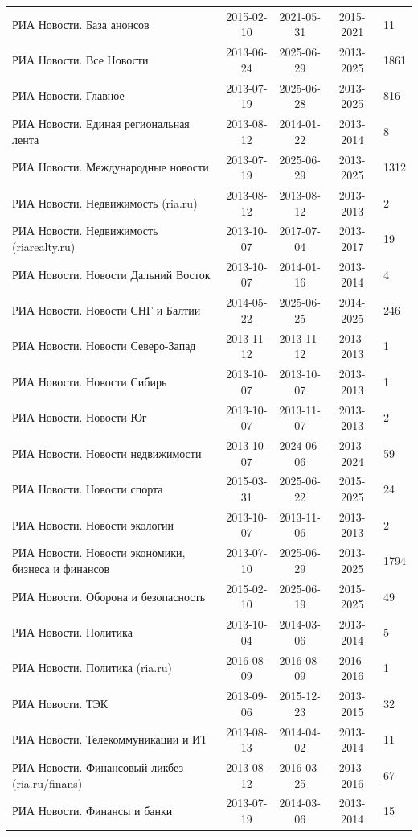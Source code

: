 \begin{longtable}{p{6cm}cccp{2cm}}
РИА Новости. База анонсов & 2015-02-10 & 2021-05-31 & 2015-2021 & 11\\
РИА Новости. Все Новости & 2013-06-24 & 2025-06-29 & 2013-2025 & 1861\\
РИА Новости. Главное & 2013-07-19 & 2025-06-28 & 2013-2025 & 816\\
РИА Новости. Единая региональная лента & 2013-08-12 & 2014-01-22 & 2013-2014 & 8\\
РИА Новости. Международные новости & 2013-07-19 & 2025-06-29 & 2013-2025 & 1312\\
РИА Новости. Недвижимость (ria.ru) & 2013-08-12 & 2013-08-12 & 2013-2013 & 2\\
РИА Новости. Недвижимость (riarealty.ru) & 2013-10-07 & 2017-07-04 & 2013-2017 & 19\\
РИА Новости. Новости Дальний Восток & 2013-10-07 & 2014-01-16 & 2013-2014 & 4\\
РИА Новости. Новости СНГ и Балтии & 2014-05-22 & 2025-06-25 & 2014-2025 & 246\\
РИА Новости. Новости Северо-Запад & 2013-11-12 & 2013-11-12 & 2013-2013 & 1\\
РИА Новости. Новости Сибирь & 2013-10-07 & 2013-10-07 & 2013-2013 & 1\\
РИА Новости. Новости Юг & 2013-10-07 & 2013-11-07 & 2013-2013 & 2\\
РИА Новости. Новости недвижимости & 2013-10-07 & 2024-06-06 & 2013-2024 & 59\\
РИА Новости. Новости спорта & 2015-03-31 & 2025-06-22 & 2015-2025 & 24\\
РИА Новости. Новости экологии & 2013-10-07 & 2013-11-06 & 2013-2013 & 2\\
РИА Новости. Новости экономики, бизнеса и финансов & 2013-07-10 & 2025-06-29 & 2013-2025 & 1794\\
РИА Новости. Оборона и безопасность & 2015-02-10 & 2025-06-19 & 2015-2025 & 49\\
РИА Новости. Политика & 2013-10-04 & 2014-03-06 & 2013-2014 & 5\\
РИА Новости. Политика (ria.ru) & 2016-08-09 & 2016-08-09 & 2016-2016 & 1\\
РИА Новости. ТЭК & 2013-09-06 & 2015-12-23 & 2013-2015 & 32\\
РИА Новости. Телекоммуникации и ИТ & 2013-08-13 & 2014-04-02 & 2013-2014 & 11\\
РИА Новости. Финансовый ликбез (ria.ru/finans) & 2013-08-12 & 2016-03-25 & 2013-2016 & 67\\
РИА Новости. Финансы и банки & 2013-07-19 & 2014-03-06 & 2013-2014 & 15\\

\end{longtable}
